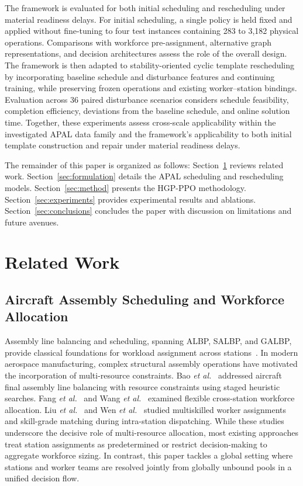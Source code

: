 \documentclass[journal,10pt]{IEEEtran}
\begin{document}
The framework is evaluated for both initial scheduling and rescheduling under material readiness delays. For initial scheduling, a single policy is held fixed and applied without fine-tuning to four test instances containing 283 to 3,182 physical operations. Comparisons with workforce pre-assignment, alternative graph representations, and decision architectures assess the role of the overall design. The framework is then adapted to stability-oriented cyclic template rescheduling by incorporating baseline schedule and disturbance features and continuing training, while preserving frozen operations and existing worker--station bindings. Evaluation across 36 paired disturbance scenarios considers schedule feasibility, completion efficiency, deviations from the baseline schedule, and online solution time. Together, these experiments assess cross-scale applicability within the investigated APAL data family and the framework's applicability to both initial template construction and repair under material readiness delays.

The remainder of this paper is organized as follows: Section~\ref{sec:related} reviews related work. Section~\ref{sec:formulation} details the APAL scheduling and rescheduling models. Section~\ref{sec:method} presents the HGP-PPO methodology. Section~\ref{sec:experiments} provides experimental results and ablations. Section~\ref{sec:conclusions} concludes the paper with discussion on limitations and future avenues.

\section{Related Work}\label{sec:related}

\subsection{Aircraft Assembly Scheduling and Workforce Allocation}

Assembly line balancing and scheduling, spanning ALBP, SALBP, and GALBP, provide classical foundations for workload assignment across stations~\cite{becker2006,boysen2007,battaia2013}. In modern aerospace manufacturing, complex structural assembly operations have motivated the incorporation of multi-resource constraints. Bao \textit{et al.}~\cite{bao2023,bao2023b} addressed aircraft final assembly line balancing with resource constraints using staged heuristic searches. Fang \textit{et al.}~\cite{fang2021flexible} and Wang \textit{et al.}~\cite{wang2024} examined flexible cross-station workforce allocation. Liu \textit{et al.}~\cite{liu2025} and Wen \textit{et al.}~\cite{wen2026} studied multiskilled worker assignments and skill-grade matching during intra-station dispatching. While these studies underscore the decisive role of multi-resource allocation, most existing approaches treat station assignments as predetermined or restrict decision-making to aggregate workforce sizing. In contrast, this paper tackles a global setting where stations and worker teams are resolved jointly from globally unbound pools in a unified decision flow.
\end{document}
